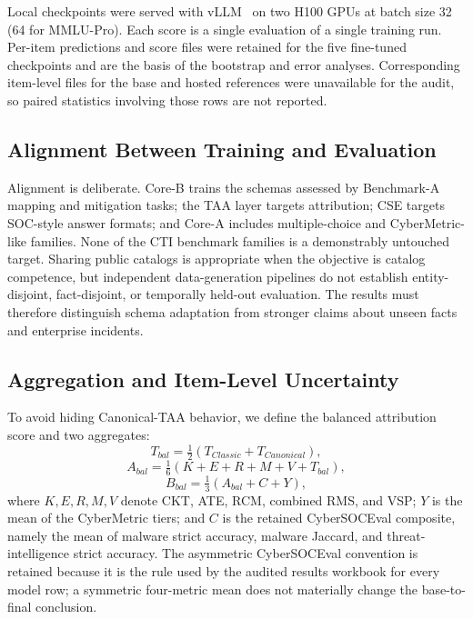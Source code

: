 \documentclass[conference]{IEEEtran}
\begin{document}
Local checkpoints were served with vLLM~\cite{kwon2023vllm} on two H100 GPUs at batch size 32 (64 for MMLU-Pro). Each score is a single evaluation of a single training run. Per-item predictions and score files were retained for the five fine-tuned checkpoints and are the basis of the bootstrap and error analyses. Corresponding item-level files for the base and hosted references were unavailable for the audit, so paired statistics involving those rows are not reported.

\subsection{Alignment Between Training and Evaluation}
Alignment is deliberate. Core-B trains the schemas assessed by Benchmark-A mapping and mitigation tasks; the TAA layer targets attribution; CSE targets SOC-style answer formats; and Core-A includes multiple-choice and CyberMetric-like families. None of the CTI benchmark families is a demonstrably untouched target. Sharing public catalogs is appropriate when the objective is catalog competence, but independent data-generation pipelines do not establish entity-disjoint, fact-disjoint, or temporally held-out evaluation. The results must therefore distinguish schema adaptation from stronger claims about unseen facts and enterprise incidents.

\subsection{Aggregation and Item-Level Uncertainty}
To avoid hiding Canonical-TAA behavior, we define the balanced attribution score and two aggregates:
\begin{equation}
T_{bal}=\tfrac{1}{2}(T_{Classic}+T_{Canonical}),
\end{equation}
\begin{equation}
A_{bal}=\tfrac{1}{6}(K+E+R+M+V+T_{bal}),
\end{equation}
\begin{equation}
B_{bal}=\tfrac{1}{3}(A_{bal}+C+Y),
\end{equation}
where $K,E,R,M,V$ denote CKT, ATE, RCM, combined RMS, and VSP; $Y$ is the mean of the CyberMetric tiers; and $C$ is the retained CyberSOCEval composite, namely the mean of malware strict accuracy, malware Jaccard, and threat-intelligence strict accuracy. The asymmetric CyberSOCEval convention is retained because it is the rule used by the audited results workbook for every model row; a symmetric four-metric mean does not materially change the base-to-final conclusion.
\end{document}
